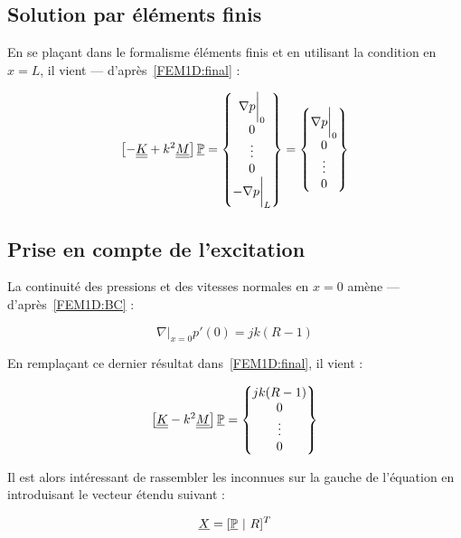 \subsection{Solution par éléments finis}

En se plaçant dans le formalisme éléments finis et en utilisant la condition en $x=L$, il vient --- d'après~\eqref{FEM1D:final} :

\begin{equation}
	\left[- \underline{\underline{K}} + k^2\underline{\underline{M}}\right]\underline{\mathbb{P}} = \begin{Bmatrix} \nabla p\bigg|_0\\0\\\vdots\\0\\-\nabla p\bigg|_L\end{Bmatrix} = \begin{Bmatrix} \nabla p\bigg|_0\\0\\\vdots\\0\end{Bmatrix}
	\label{FEM1D:post_BCL}
\end{equation}

\subsection{Prise en compte de l'excitation}

La continuité des pressions et des vitesses normales en $x=0$ amène --- d'après~\eqref{FEM1D:BC} :

\begin{equation*}
	\left.\nabla\right|_{x=0} p'(0) = jk(R-1)
\end{equation*}

En remplaçant ce dernier résultat dans~\eqref{FEM1D:final}, il vient :

\begin{equation*}
\left[\underline{\underline{K}} - k^2\underline{\underline{M}}\right]\underline{\mathbb{P}} = \begin{Bmatrix} jk(R-1)  \\0\\\vdots\\0\end{Bmatrix}
\end{equation*}

Il est alors intéressant de rassembler les inconnues sur la gauche de l'équation en introduisant le vecteur étendu
suivant :

\begin{equation*}
	\underline{X} = [\underline{\mathbb{P}} ~|~ R]^T
\end{equation*}

